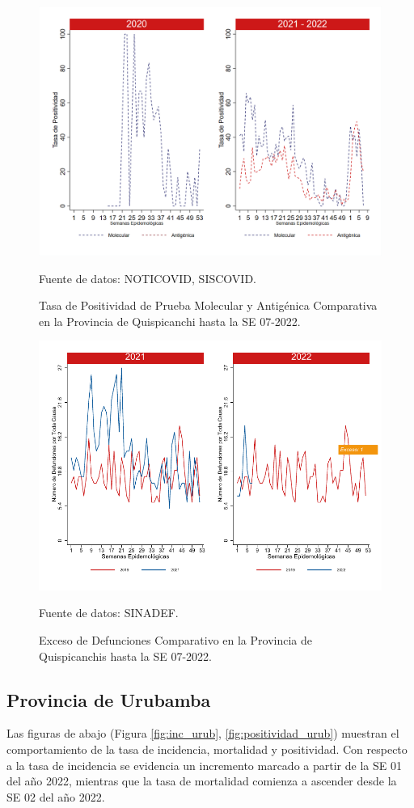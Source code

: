 \documentclass[12pt,a4paper,openany]{book}
\begin{document}
		\begin{figure}[h]
			\caption{Tasa de Positividad de Prueba Molecular y Antigénica Comparativa en la Provincia de Quispicanchi hasta la SE 07-2022.}\label{fig:positividad_quisp}
			\begin{center}
				\includegraphics[width=0.7\linewidth]{../figuras/positividad_20_21_12.png}
			\end{center}
			{\footnotesize {Fuente de datos: NOTICOVID, SISCOVID.}}
		\end{figure}
		
		\begin{figure}[h]
			\caption{Exceso de Defunciones Comparativo en la Provincia de Quispicanchis hasta la SE 07-2022.}\label{fig:exceso_quisp}
			\begin{center}
				\includegraphics[width=0.7\linewidth]{../figuras/exceso_12.pdf}
			\end{center}
			{\footnotesize {Fuente de datos: SINADEF.}}
		\end{figure}
		
		\clearpage
		
		\subsection*{Provincia de Urubamba}
		\noindent Las figuras de abajo (Figura \ref{fig:inc_urub}, \ref{fig:positividad_urub}) muestran el comportamiento de la tasa de incidencia, mortalidad y positividad. Con respecto a la tasa de incidencia se evidencia un incremento marcado a partir de la SE 01 del año 2022, mientras que la tasa de mortalidad comienza a ascender desde la SE 02 del año 2022. 
	
\end{document}
